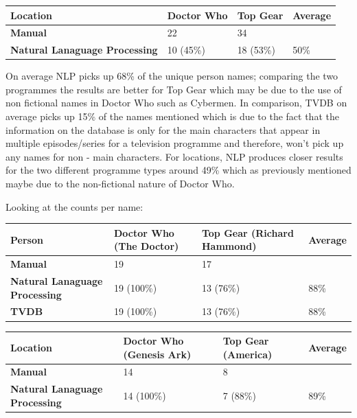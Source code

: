 \begin{center}
\begin{tabular}{|p{170pt}|p{70pt}|p{70pt}|p{70pt}|}
\hline
\textbf{Location}					&\textbf{Doctor Who}	&\textbf{Top Gear}	&\textbf{Average}
\\\hline
\textbf{Manual}				&22			&34			&
\\\hline
\textbf{Natural Lanaguage Processing}	&10 (45\%)	&18 (53\%)	&50\%
\\\hline
\end{tabular}
\end{center}

On average NLP picks up 68\% of the unique person names; comparing the two programmes the results are better for Top Gear which may be due to the use of non fictional names in Doctor Who such as Cybermen. In comparison, TVDB on average picks up 15\% of the names mentioned which is due to the fact that the information on the database is only for the main characters that appear in multiple episodes/series  for a television programme and therefore, won’t pick up any names for non - main characters. For locations, NLP produces closer results for the two different programme types around 49\% which as previously mentioned maybe due to the non-fictional nature of Doctor Who. 

Looking at the counts per name:
\begin{center}
\begin{tabular}{|p{170pt}|p{70pt}|p{70pt}|p{70pt}|}
\hline
\textbf{Person}					&\textbf{Doctor Who (The Doctor)	}&\textbf{Top Gear (Richard Hammond)}	&\textbf{Average}
\\\hline
\textbf{Manual}					&19						&17							&
\\\hline
\textbf{Natural Lanaguage Processing}	&19 (100\%)				&13 (76\%)					&88\%
\\\hline
\textbf{TVDB}					&19 (100\%)				&13 (76\%)					&88\%
\\\hline
\end{tabular}
\end{center}

\begin{center}
\begin{tabular}{|p{170pt}|p{70pt}|p{70pt}|p{70pt}|}
\hline
\textbf{Location	}				&\textbf{Doctor Who (Genesis Ark)}	&\textbf{Top Gear (America)}	&\textbf{Average}
\\\hline
\textbf{Manual}					&14						&8						&
\\\hline
\textbf{Natural Lanaguage Processing}	&14 (100\%)				&7 (88\%)					&89\%
\\\hline
\end{tabular}
\end{center}

